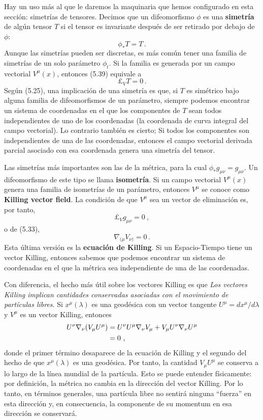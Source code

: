\documentclass[11pt,b5paper,openany,twoside]{book}
\newcommand{\mn}{{\mu\nu}}
\def\lie{\pounds}
\begin{document}
Hay un uso más al que le daremos la maquinaria que hemos configurado en esta sección: simetrías de tensores.
Decimos que un difeomorfismo $\phi$ es una {\bf simetría} de algún tensor $T$ si el tensor es invariante después de ser retirado por debajo de $\phi$:
\begin{equation}
\phi_*T = T\,.\label{5.39}
\end{equation}
Aunque las simetrías pueden ser discretas, es más común tener una familia de simetrías de un solo parámetro $\phi_t$.
Si la familia es generada por un campo vectorial $V^\mu(x)$, entonces (5.39) equivale a
\begin{equation}
\lie_V T=0\,.\label{5.40}
\end{equation}
Según (5.25), una implicación de una simetría es que, si $T$ es simétrico bajo alguna familia de difeomorfismos de un parámetro, siempre podemos encontrar un sistema de coordenadas en el que los componentes de $T$ sean todos independientes de uno de los coordenadas (la coordenada de curva integral del campo vectorial).
Lo contrario también es cierto; Si todos los componentes son independientes de una de las coordenadas, entonces el campo vectorial derivada parcial asociado con esa coordenada genera una simetría del tensor.

Las simetrías más importantes son las de la métrica, para la cual $\phi_*g_\mn = g_\mn$.
Un difeomorfismo de este tipo se llama {\bf isometría}.
Si un campo vectorial $V^\mu(x)$ genera una familia de isometrías de un parámetro, entonces $V^\mu$ se conoce como {\bf Killing vector field}.
La condición de que $V^\mu$ sea un vector de eliminación es, por tanto,
\begin{equation}
\lie_V g_\mn=0\ ,\label{5.41}
\end{equation}
o de (5.33),
\begin{equation}
\nabla_{(\mu}V_{\nu)}=0\,.\label{5.42}
\end{equation}
Esta última versión es la {\bf ecuación de Killing}.
Si un Espacio-Tiempo tiene un vector Killing, entonces sabemos que podemos encontrar un sistema de coordenadas en el que la métrica sea independiente de una de las coordenadas.

Con diferencia, el hecho más útil sobre los vectores Killing es que {\it Los vectores Killing implican cantidades conservadas asociadas con el movimiento de partículas libres}.
Si $x^\mu(\lambda)$ es una geodésica con un vector tangente $U^\mu=dx^\mu/d\lambda$ y $V^\mu$ es un vector Killing, entonces
\begin{align}
U^\nu\nabla_\nu(V_\mu U^\mu) &=  U^\nu U^\mu \nabla_\nu V_\mu
+V_\mu U^\nu \nabla_\nu U^\mu  \notag \\
&=  0\ ,\label{5.43}
\end{align}
donde el primer término desaparece de la ecuación de Killing y el segundo del hecho de que $x^\mu(\lambda)$ es una geodésica.
Por tanto, la cantidad $V_\mu U^\mu$ se conserva a lo largo de la línea mundial de la partícula.
Esto se puede entender físicamente: por definición, la métrica no cambia en la dirección del vector Killing.
Por lo tanto, en términos generales, una partícula libre no sentirá ninguna ``fuerza'' en esta dirección y, en consecuencia, la componente de su momentum en esa dirección se conservará.
\end{document}
